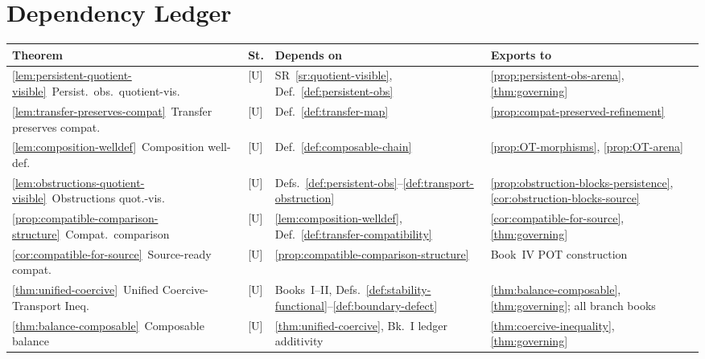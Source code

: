 \documentclass[12pt,oneside]{amsbook}
\theoremstyle{plain}
\theoremstyle{definition}
\theoremstyle{remark}
\begin{document}
\section{Dependency Ledger}

\renewcommand{\arraystretch}{1.4}
\noindent
\begin{tabular}{@{}p{4.0cm}p{0.8cm}p{3.6cm}p{4.6cm}@{}}
\hline
\textbf{Theorem} & \textbf{St.} & \textbf{Depends on} & \textbf{Exports to} \\
\hline
\ref{lem:persistent-quotient-visible}\ Persist.\ obs.\ quotient-vis.
  & [U] & SR~\ref{sr:quotient-visible}, Def.~\ref{def:persistent-obs}
  & \ref{prop:persistent-obs-arena}, \ref{thm:governing} \\

\ref{lem:transfer-preserves-compat}\ Transfer preserves compat.
  & [U] & Def.~\ref{def:transfer-map}
  & \ref{prop:compat-preserved-refinement} \\

\ref{lem:composition-welldef}\ Composition well-def.
  & [U] & Def.~\ref{def:composable-chain}
  & \ref{prop:OT-morphisms}, \ref{prop:OT-arena} \\

\ref{lem:obstructions-quotient-visible}\ Obstructions quot.-vis.
  & [U] & Defs.~\ref{def:persistent-obs}--\ref{def:transport-obstruction}
  & \ref{prop:obstruction-blocks-persistence}, \ref{cor:obstruction-blocks-source} \\

\ref{prop:compatible-comparison-structure}\ Compat.\ comparison
  & [U] & \ref{lem:composition-welldef}, Def.~\ref{def:transfer-compatibility}
  & \ref{cor:compatible-for-source}, \ref{thm:governing} \\

\ref{cor:compatible-for-source}\ Source-ready compat.
  & [U] & \ref{prop:compatible-comparison-structure}
  & Book~IV POT construction \\

\ref{thm:unified-coercive}\ Unified Coercive-Transport Ineq.
  & [U] & Books~I--II, Defs.~\ref{def:stability-functional}--\ref{def:boundary-defect}
  & \ref{thm:balance-composable}, \ref{thm:governing}; all branch books \\

\ref{thm:balance-composable}\ Composable balance
  & [U] & \ref{thm:unified-coercive}, Bk.~I ledger additivity
  & \ref{thm:coercive-inequality}, \ref{thm:governing} \\


\end{tabular}
\end{document}
